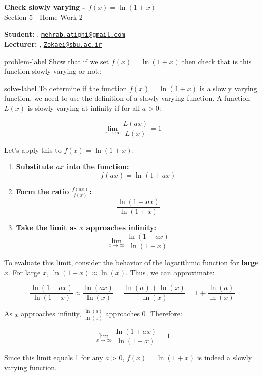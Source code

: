 	






		\begin{Large}
		\textsf{\textbf{Check slowly varying - $f(x) = \ln(1+x)$}}\\
		Section 5 - Home Work 2
	\end{Large}
	
	\vspace{1ex}
	
	\textsf{\textbf{Student:}} , \href{mailto:mehrab.atighi@gmail.com}{\texttt{mehrab.atighi@gmail.com}}\\
	\textsf{\textbf{Lecturer:}} , \href{mailto:Zokaei@sbu.ac.ir}{\texttt{Zokaei@sbu.ac.ir}}
	
	
	\vspace{2ex}
	
	\begin{problem}{}{problem-label}
		Show that if we set $f(x) = \ln(1+x)$ then check that is this function slowly varying or not.\cite{Embrechts.etal1997}:
	\end{problem}
	
	\begin{solve}{}{solve-label}
		To determine if the function \( f(x) = \ln(1+x) \) is a slowly varying function, we need to use the definition of a slowly varying function. A function \( L(x) \) is slowly varying at infinity if for all \( a > 0 \):
		
		$$ \lim_{x \to \infty} \frac{L(ax)}{L(x)} = 1 $$
		
		Let's apply this to \( f(x) = \ln(1+x) \):
		\begin{enumerate}
			\item 		\textbf{Substitute \( ax \) into the function:}
			$$f(ax) = \ln(1+ax)$$
			
			\item \textbf{Form the ratio \( \frac{f(ax)}{f(x)} \):}
			$$\frac{\ln(1+ax)}{\ln(1+x)}$$
			\item \textbf{Take the limit as \( x \) approaches infinity:}
			$$\lim_{x \to \infty} \frac{\ln(1+ax)}{\ln(1+x)}$$
		\end{enumerate}

		
		To evaluate this limit, consider the behavior of the logarithmic function for \textbf{large \( x \)}. For large \( x \), \( \ln(1+x) \approx \ln(x) \). Thus, we can approximate:
		
		\[
		\frac{\ln(1+ax)}{\ln(1+x)} \approx \frac{\ln(ax)}{\ln(x)} = \frac{\ln(a) + \ln(x)}{\ln(x)} = 1 + \frac{\ln(a)}{\ln(x)}
		\]
		
		As \( x \) approaches infinity, \( \frac{\ln(a)}{\ln(x)} \) approaches 0. Therefore:
		
		\[
		\lim_{x \to \infty} \frac{\ln(1+ax)}{\ln(1+x)} = 1
		\]
		
		Since this limit equals 1 for any \( a > 0 \), \( f(x) = \ln(1+x) \) is indeed a slowly varying function.
		\cite{r1,r2,r3,r4,r5,r6,r7,r8,r9,r10}
	\end{solve}
	
	
	
	
	
